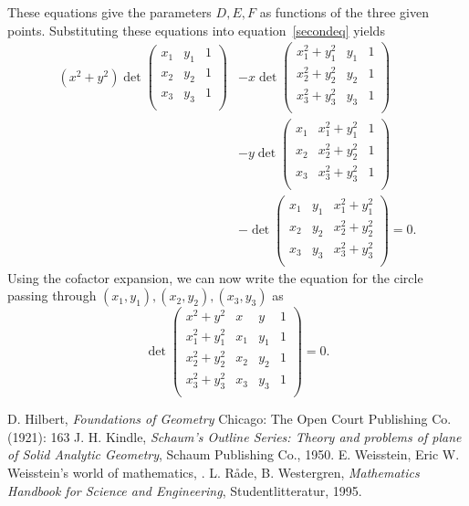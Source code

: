 \documentclass[12pt]{article}
\begin{document}
These equations give the parameters $D,E,F$ as functions of the 
three given points. 
Substituting these equations into equation~\eqref{secondeq} yields
\begin{align*}
(x^2 + y^2)\det \begin{pmatrix}
 x_1 & y_1 & 1 \\
 x_2 & y_2 & 1 \\
 x_3 & y_3 & 1 \\
 \end{pmatrix}  &\mathbin{ - } x\det \begin{pmatrix}
 x_1^2 + y_1^2  & y_1 & 1 \\
 x_2^2 + y_2^2  & y_2 & 1 \\
 x_3^2 + y_3^2 & y_3 & 1 \\
 \end{pmatrix} \\
&\mathbin{ - } y\det \begin{pmatrix}
 x_1 & x_1^2 + y_1^2  & 1 \\
 x_2 & x_2^2 + y_2^2  & 1 \\
 x_3 & x_3^2 + y_3^2  & 1 \\
 \end{pmatrix} \\
 &\mathbin{ - } \det \begin{pmatrix}
 x_1 & y_1 & x_1^2 + y_1^2 \\
 x_2 & y_2 & x_2^2 + y_2^2 \\
 x_3 & y_3 & x_3^2 + y_3^2 \\
 \end{pmatrix} = 0.
\end{align*}
Using the cofactor expansion, we can now write the equation for the circle passing through $(x_1,y_1), (x_2,y_2), (x_3,y_3)$ as \cite{weissteincirc, beta}
\begin{equation}
\label{determ}
\det \begin{pmatrix}
 x^2 + y^2 & x & y & 1 \\
 x_1^2 + y_1^2 & x_1 & y_1 & 1 \\
 x_2^2 + y_2^2 & x_2 & y_2 & 1 \\
 x_3^2 + y_3^2 & x_3 & y_3 & 1 \\
 \end{pmatrix} = 0.
\end{equation}

\begin{thebibliography}{9}
 D. Hilbert, {\it Foundations of Geometry} Chicago: The Open Court Publishing Co. (1921): 163
 J. H. Kindle,
        \emph{Schaum's Outline Series: Theory and problems of plane of Solid Analytic Geometry},
        Schaum Publishing Co., 1950.
 E. Weisstein, Eric W. Weisstein's world of mathematics, 
.
 L. R\r{a}de, B. Westergren,
 \emph{Mathematics Handbook for Science and Engineering},
 Studentlitteratur, 1995.
\end{thebibliography}
\end{document}

